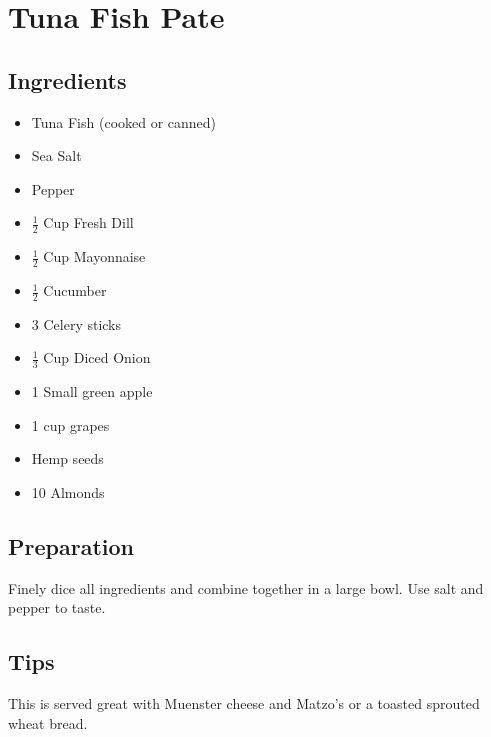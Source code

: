 \thispagestyle{fancy}
\section{Tuna Fish Pate} \label{TunaPate}
\AddToShipoutPicture*{\TunaPate}

\subsection*{Ingredients}

\begin{multicols}{3}
	\begin{itemize}
		\item Tuna Fish (cooked or canned)
		\item Sea Salt
		\item Pepper
		\item $\frac{1}{2}$ Cup Fresh Dill
		\item $\frac{1}{2}$ Cup Mayonnaise
		\item $\frac{1}{2}$ Cucumber
		\item 3 Celery sticks
		\item $\frac{1}{3}$ Cup Diced Onion
		\item 1 Small green apple
		\item 1 cup grapes
		\item Hemp seeds
		\item 10 Almonds
	\end{itemize}
\end{multicols}

\subsection*{Preparation}

Finely dice all ingredients and combine together in a large bowl. Use salt and pepper to taste. 

\subsection*{Tips}

This is served great with Muenster cheese and Matzo's or a toasted sprouted wheat bread. 